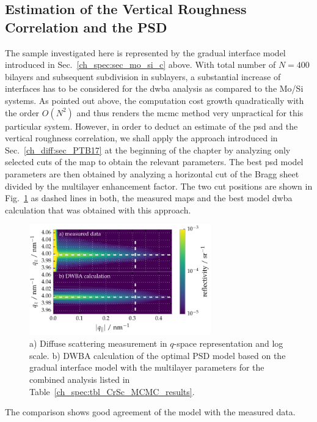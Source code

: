 \subsection{Estimation of the Vertical Roughness Correlation and the PSD}
The sample investigated here is represented by the gradual interface model introduced in Sec.~\ref{ch_spec:sec_mo_si_c} above. With total number of $N=400$ bilayers and subsequent subdivision in sublayers, a substantial increase of interfaces has to be considered for the \gls{dwba} analysis as compared to the Mo/Si systems. As pointed out above, the computation cost growth quadratically with the order $O(N^2)$ and thus renders the \gls{mcmc} method very unpractical for this particular system. However, in order to deduct an estimate of the \gls{psd} and the vertical roughness correlation, we shall apply the approach introduced in Sec.~\ref{ch_diff:sec_PTB17} at the beginning of the chapter by analyzing only selected cuts of the map to obtain the relevant parameters. The best \gls{psd} model parameters are then obtained by analyzing a horizontal cut of the Bragg sheet divided by the multilayer enhancement factor. The two cut positions are shown in Fig.~\ref{ch_diff:fig_CrSc_diffuse_measured_vs_dwba} as dashed lines in both, the measured maps and the best model \gls{dwba} calculation that was obtained with this approach.
\begin{figure}[htbp]
  \centering
  \includegraphics[width=0.7\textwidth]{img/CrSc_diffuse_measured_vs_dwba}
  \caption{a) Diffuse scattering measurement in $q$-space representation and 
log scale. b) DWBA calculation of the optimal PSD model based on the gradual interface model with the multilayer parameters for the combined analysis listed 
in Table~\ref{ch_spec:tbl_CrSc_MCMC_results}.}
  \label{ch_diff:fig_CrSc_diffuse_measured_vs_dwba}
\end{figure}
The comparison shows good agreement of the model with the measured data.

